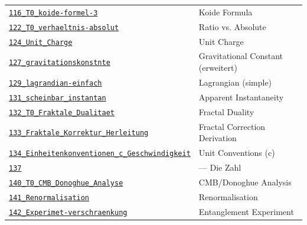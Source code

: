 {\begin{longtable}{@{}>{\raggedright\arraybackslash}p{} >{\raggedright\arraybackslash}p{}@{}}
\href{https://github.com/jpascher/T0-Time-Mass-Duality/blob/main/2/pdf/116_T0_koide-formel-3_De.pdf}{\texttt{116\_T0\_koide-formel-3}} & Koide Formula \\
\href{https://github.com/jpascher/T0-Time-Mass-Duality/blob/main/2/pdf/122_T0_verhaeltnis-absolut_De.pdf}{\texttt{122\_T0\_verhaeltnis-absolut}} & Ratio vs. Absolute \\
\href{https://github.com/jpascher/T0-Time-Mass-Duality/blob/main/2/pdf/124_Unit_Charge_De.pdf}{\texttt{124\_Unit\_Charge}} & Unit Charge \\
\href{https://github.com/jpascher/T0-Time-Mass-Duality/blob/main/2/pdf/127_gravitationskonstnte_De.pdf}{\texttt{127\_gravitationskonstnte}} & Gravitational Constant (erweitert) \\
\href{https://github.com/jpascher/T0-Time-Mass-Duality/blob/main/2/pdf/129_lagrandian-einfach_De.pdf}{\texttt{129\_lagrandian-einfach}} & Lagrangian (simple) \\
\href{https://github.com/jpascher/T0-Time-Mass-Duality/blob/main/2/pdf/131_scheinbar_instantan_De.pdf}{\texttt{131\_scheinbar\_instantan}} & Apparent Instantaneity \\
\href{https://github.com/jpascher/T0-Time-Mass-Duality/blob/main/2/pdf/132_T0_Fraktale_Dualitaet_De.pdf}{\texttt{132\_T0\_Fraktale\_Dualitaet}} & Fractal Duality \\
\href{https://github.com/jpascher/T0-Time-Mass-Duality/blob/main/2/pdf/133_Fraktale_Korrektur_Herleitung_De.pdf}{\texttt{133\_Fraktale\_Korrektur\_Herleitung}} & Fractal Correction Derivation \\
\href{https://github.com/jpascher/T0-Time-Mass-Duality/blob/main/2/pdf/134_Einheitenkonventionen_c_Geschwindigkeit_De.pdf}{\texttt{134\_Einheitenkonventionen\_c\_Geschwindigkeit}} & Unit Conventions (c) \\
\href{https://github.com/jpascher/T0-Time-Mass-Duality/blob/main/2/pdf/137_De.pdf}{\texttt{137}} & 137 — Die Zahl \\
\href{https://github.com/jpascher/T0-Time-Mass-Duality/blob/main/2/pdf/140_T0_CMB_Donoghue_Analyse_De.pdf}{\texttt{140\_T0\_CMB\_Donoghue\_Analyse}} & CMB/Donoghue Analysis \\
\href{https://github.com/jpascher/T0-Time-Mass-Duality/blob/main/2/pdf/141_Renormalisation_De.pdf}{\texttt{141\_Renormalisation}} & Renormalisation \\
\href{https://github.com/jpascher/T0-Time-Mass-Duality/blob/main/2/pdf/142_Experimet-verschraenkung_De.pdf}{\texttt{142\_Experimet-verschraenkung}} & Entanglement Experiment \\

\end{longtable}}
